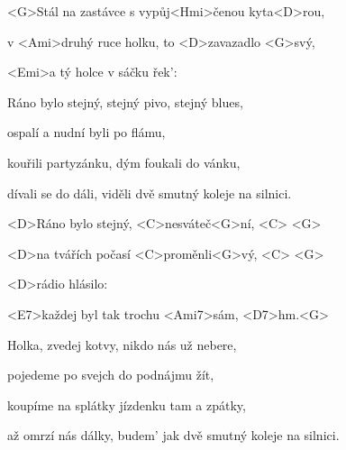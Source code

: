 

\zs
<G>Stál na zastávce s vypůj<Hmi>čenou kyta<D>rou,

v <Ami>druhý ruce holku, to <D>zavazadlo <G>svý,

<Emi>a tý holce v sáčku řek': 
\ks

\zs
Ráno bylo stejný, stejný pivo, stejný blues,

ospalí a nudní byli po flámu,

kouřili partyzánku, dým foukali do vánku,

dívali se do dáli, viděli dvě smutný koleje na silnici.
\ks

\zr
<D>Ráno bylo stejný, <C>nesváteč<G>ní, <C> <G>

<D>na tvářích počasí <C>proměnli<G>vý, <C> <G>

<D>rádio hlásilo: 

<E7>každej byl tak trochu <Ami7>sám, <D7>hm.<G>
\kr

\zs
Holka, zvedej kotvy, nikdo nás už nebere,

pojedeme po svejch do podnájmu žít,

koupíme na splátky jízdenku tam a zpátky,

až omrzí nás dálky, budem' jak dvě smutný koleje na silnici.
\ks

\zr	\kr

\kp
